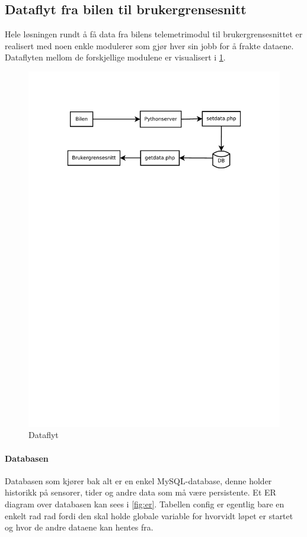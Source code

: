 \subsection{Dataflyt fra bilen til brukergrensesnitt}
Hele løsningen rundt å få data fra bilens telemetrimodul til brukergrensesnittet er realisert med noen enkle modulerer som gjør hver sin jobb for å frakte dataene. Dataflyten mellom de forskjellige modulene er visualisert i \ref{fig:dataflow}.

\begin{figure}[H]
\includegraphics[width=\textwidth, trim=0 540 0 75]{images/dataflow.pdf}
\caption{Dataflyt}
\label{fig:dataflow}
\end{figure}

\paragraph{Databasen}
Databasen som kjører bak alt er en enkel MySQL-database, denne holder historikk på sensorer, tider og andre data som må være persistente. Et ER diagram over databasen kan sees i \ref{fig:er}. Tabellen config er egentlig bare en enkelt rad rad fordi den skal holde globale variable for hvorvidt løpet er startet og hvor de andre dataene kan hentes fra.

